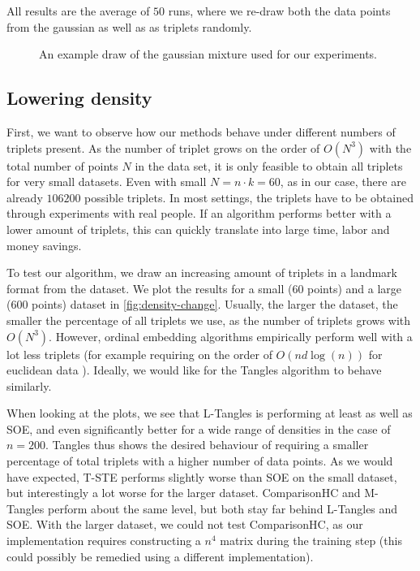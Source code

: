 All results are the average of $50$ runs, where we re-draw both the data points from the gaussian as well as as triplets randomly. 

\begin{figure}[ht]
    \centering
    \resizebox{0.8\textwidth}{!}{}
    \caption{An example draw of the gaussian mixture used for our experiments.}
    \label{fig:dataset-gauss}
\end{figure}

\subsection{Lowering density}\label{sec:lower-density}
First, we want to observe how our methods behave under different numbers of triplets present. 
As the number of triplet grows on the order of $O(N^3)$ with the total number of points $N$ in the data set, it is only feasible to obtain
all triplets for very small datasets. Even with small $N = n \cdot k = 60$, as in our case, there are already $106200$ possible triplets. In most settings, the triplets have to be obtained 
through experiments with real people. If an algorithm performs better with a lower amount
of triplets, this can quickly translate into large time, labor and money savings. 

To test our algorithm, we draw an increasing amount of triplets in a landmark format from the dataset. 
We plot the results for a small (60 points) and a large (600 points) dataset in \autoref{fig:density-change}. 
Usually, the larger the dataset, the smaller the percentage of all triplets we use, as the number of triplets grows with $O(N^3)$. 
However, ordinal embedding algorithms empirically perform well with a lot
less triplets (for example requiring on the order of $O(n d \log(n))$ for euclidean data \citep{jainFiniteSamplePrediction2016}). 
Ideally, we would like for the Tangles algorithm to behave similarly. 

When looking at the plots, we see that L-Tangles is performing at least as well as SOE, and even significantly better for a wide range of densities in the case of $n=200$. 
Tangles thus shows the desired behaviour of requiring a smaller percentage of total triplets with a higher number of data points.
As we would have expected, T-STE performs slightly worse than SOE on the small dataset, but interestingly a lot worse for the larger dataset. ComparisonHC and M-Tangles
perform about the same level, but both stay far behind L-Tangles and SOE. With the larger dataset, we could not test ComparisonHC, as our implementation requires 
constructing a $n^4$ matrix during the training step (this could possibly be remedied using a different implementation). 

